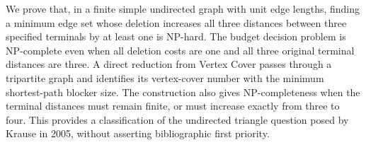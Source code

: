 
We prove that, in a finite simple undirected graph with unit edge lengths,
finding a minimum edge set whose deletion increases all three distances between
three specified terminals by at least one is NP-hard. The budget decision problem
is NP-complete even when all deletion costs are one and all three original
terminal distances are three. A direct reduction from Vertex Cover passes through
a tripartite graph and identifies its vertex-cover number with the minimum
shortest-path blocker size. The construction also gives NP-completeness when
the terminal distances must remain finite, or must increase exactly from three
to four. This provides a classification of the undirected triangle question
posed by Krause in 2005, without asserting bibliographic first priority.

